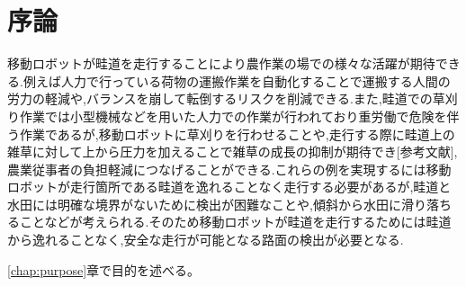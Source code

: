 \chapter{序論}
移動ロボットが畦道を走行することにより農作業の場での様々な活躍が期待できる.例えば人力で行っている荷物の運搬作業を自動化することで運搬する人間の労力の軽減や,バランスを崩して転倒するリスクを削減できる.また,畦道での草刈り作業では小型機械などを用いた人力での作業が行われており重労働で危険を伴う作業であるが,移動ロボットに草刈りを行わせることや,走行する際に畦道上の雑草に対して上から圧力を加えることで雑草の成長の抑制が期待でき[参考文献],農業従事者の負担軽減につなげることができる.これらの例を実現するには移動ロボットが走行箇所である畦道を逸れることなく走行する必要があるが,畦道と水田には明確な境界がないために検出が困難なことや,傾斜から水田に滑り落ちることなどが考えられる.そのため移動ロボットが畦道を走行するためには畦道から逸れることなく,安全な走行が可能となる路面の検出が必要となる.

\ref{chap:purpose}章で目的を述べる。

%
